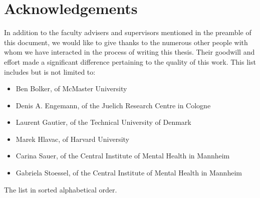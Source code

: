 \chapter{Acknowledgements}
    In addition to the faculty advisers and supervisors mentioned in the preamble of this document, we would like to give thanks to the numerous other people with whom we have interacted in the process of writing this thesis.
    Their goodwill and effort made a significant difference pertaining to the quality of this work.
    This list includes but is not limited to:
    \begin{itemize}
	\item Ben Bolker, of McMaster University
        \item Denis A. Engemann, of the Juelich Research Centre in Cologne
	\item Laurent Gautier, of the Technical University of Denmark
	\item Marek Hlavac, of Harvard University
	\item Carina Sauer, of the Central Institute of Mental Health in Mannheim
	\item Gabriela Stoessel, of the Central Institute of Mental Health in Mannheim
    \end{itemize}
    The list in sorted alphabetical order.

